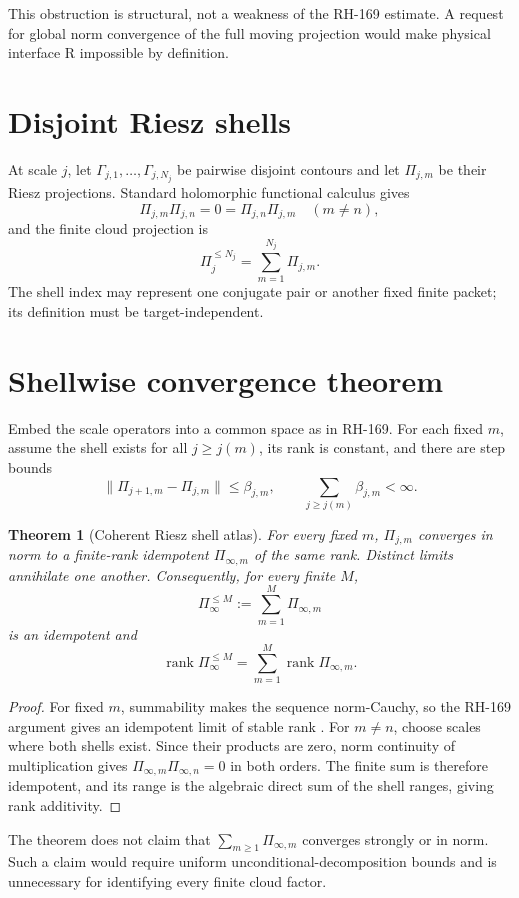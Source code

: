 \documentclass[12pt]{article}
\newtheorem{theorem}{Theorem}
\newcommand{\norm}[1]{\lVert#1\rVert}
\begin{document}
This obstruction is structural, not a weakness of the RH-169 estimate.  A
request for global norm convergence of the full moving projection would make
physical interface R impossible by definition.

\section{Disjoint Riesz shells}
At scale $j$, let $\Gamma_{j,1},\ldots,\Gamma_{j,N_j}$ be pairwise disjoint
contours and let $\Pi_{j,m}$ be their Riesz projections.  Standard
holomorphic functional calculus gives
\[
 \Pi_{j,m}\Pi_{j,n}=0=\Pi_{j,n}\Pi_{j,m}\quad(m\ne n),
\]
and the finite cloud projection is
\[
 \Pi_j^{\le N_j}=\sum_{m=1}^{N_j}\Pi_{j,m}.
\]
The shell index may represent one conjugate pair or another fixed finite
packet; its definition must be target-independent.

\section{Shellwise convergence theorem}
Embed the scale operators into a common space as in RH-169.  For each fixed
$m$, assume the shell exists for all $j\ge j(m)$, its rank is constant, and
there are step bounds
\[
 \norm{\Pi_{j+1,m}-\Pi_{j,m}}\le\beta_{j,m},
 \qquad
 \sum_{j\ge j(m)}\beta_{j,m}<\infty.
\]

\begin{theorem}[Coherent Riesz shell atlas]\label{thm:shell}
For every fixed $m$, $\Pi_{j,m}$ converges in norm to a finite-rank
idempotent $\Pi_{\infty,m}$ of the same rank.  Distinct limits annihilate one
another.  Consequently, for every finite $M$,
\[
 \Pi_\infty^{\le M}:=\sum_{m=1}^{M}\Pi_{\infty,m}
\]
is an idempotent and
\[
 \operatorname{rank}\Pi_\infty^{\le M}
 =\sum_{m=1}^{M}\operatorname{rank}\Pi_{\infty,m}.
\]
\end{theorem}
\begin{proof}
For fixed $m$, summability makes the sequence norm-Cauchy, so the RH-169
argument gives an idempotent limit of stable rank \citep{WangRH169}.  For
$m\ne n$, choose scales where both shells exist.  Since their products are
zero, norm continuity of multiplication gives
$\Pi_{\infty,m}\Pi_{\infty,n}=0$ in both orders.  The finite sum is therefore
idempotent, and its range is the algebraic direct sum of the shell ranges,
giving rank additivity.
\end{proof}

The theorem does not claim that
$\sum_{m\ge1}\Pi_{\infty,m}$ converges strongly or in norm.  Such a claim
would require uniform unconditional-decomposition bounds and is unnecessary
for identifying every finite cloud factor.
\end{document}
